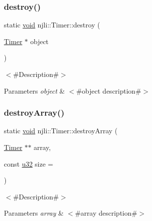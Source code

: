 \mbox{\label{classnjli_1_1_timer_a26931f44e8a19f4396743871d159db86}} 
\subsubsection{\texorpdfstring{destroy()}{destroy()}}
{\footnotesize\ttfamily static \mbox{\hyperlink{_thread_8h_af1e856da2e658414cb2456cb6f7ebc66}{void}} njli\+::\+Timer\+::destroy (\begin{DoxyParamCaption}\item[{\mbox{\hyperlink{classnjli_1_1_timer}{Timer}} $\ast$}]{object }\end{DoxyParamCaption})\hspace{0.3cm}{\ttfamily [static]}}

$<$\#\+Description\#$>$


\begin{DoxyParams}{Parameters}
{\em object} & $<$\#object description\#$>$ \\
\hline
\end{DoxyParams}
\mbox{\label{classnjli_1_1_timer_a22efffd5f7d3bd9789d6397fd2f30093}} 
\subsubsection{\texorpdfstring{destroy\+Array()}{destroyArray()}}
{\footnotesize\ttfamily static \mbox{\hyperlink{_thread_8h_af1e856da2e658414cb2456cb6f7ebc66}{void}} njli\+::\+Timer\+::destroy\+Array (\begin{DoxyParamCaption}\item[{\mbox{\hyperlink{classnjli_1_1_timer}{Timer}} $\ast$$\ast$}]{array,  }\item[{const \mbox{\hyperlink{_util_8h_a10e94b422ef0c20dcdec20d31a1f5049}{u32}}}]{size = {} }\end{DoxyParamCaption})\hspace{0.3cm}{\ttfamily [static]}}

$<$\#\+Description\#$>$


\begin{DoxyParams}{Parameters}
{\em array} & $<$\#array description\#$>$ \\
\hline
\end{DoxyParams}
\mbox{\label{classnjli_1_1_timer_ab7f75a80b1152e200a086f09ce1817c4}} 
